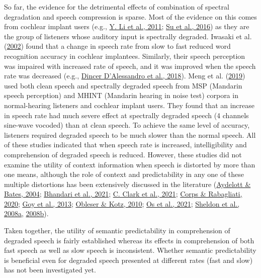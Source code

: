 \documentclass[a4paper, nobind]{templates/ociamthesis}
\begin{document}
So far, the evidence for the detrimental effects of combination of spectral degradation and speech compression is sparse. Most of the evidence on this comes from cochlear implant users (e.g., \protect\hyperlink{ref-Li2011}{Y. Li et al., 2011}; \protect\hyperlink{ref-Su2016}{Su et al., 2016}) as they are the group of listeners whose auditory input is spectrally degraded.
Iwasaki et al. (\protect\hyperlink{ref-Iwasaki2002}{2002}) found that a change in speech rate from slow to fast reduced word recognition accuracy in cochlear implantees.
Similarly, their speech perception was impaired with increased rate of speech, and it was improved when the speech rate was decreased (e.g., \protect\hyperlink{ref-Dincer2018}{Dincer D'Alessandro et al., 2018}).
Meng et al. (\protect\hyperlink{ref-Meng2019}{2019}) used both clean speech and spectrally degraded speech from MSP (Mandarin speech perception) and MHINT (Mandarin hearing in noise test) corpora in normal-hearing listeners and cochlear implant users.
They found that an increase in speech rate had much severe effect at spectrally degraded speech (4 channels sine-wave vocoded) than at clean speech.
To achieve the same level of accuracy, listeners required degraded speech to be much slower than the normal speech.
All of these studies indicated that when speech rate is increased, intelligibility and comprehension of degraded speech is reduced.
However, these studies did not examine the utility of context information when speech is distorted by more than one means, although the role of context and predictability in any one of these multiple distortions has been extensively discussed in the literature
(\protect\hyperlink{ref-Aydelott2004}{Aydelott \& Bates, 2004}; \protect\hyperlink{ref-Bhandari2021}{Bhandari et al., 2021}; \protect\hyperlink{ref-Clark2021}{C. Clark et al., 2021}; \protect\hyperlink{ref-Corps2020}{Corps \& Rabagliati, 2020}; \protect\hyperlink{ref-Goy2013}{Goy et al., 2013}; \protect\hyperlink{ref-Obleser2010}{Obleser \& Kotz, 2010}; \protect\hyperlink{ref-vanOs2021}{Os et al., 2021}; \protect\hyperlink{ref-Sheldon2008a}{Sheldon et al., 2008a}, \protect\hyperlink{ref-Sheldon2008b}{2008b}).

Taken together, the utility of semantic predictability in comprehension of degraded speech is fairly established whereas its effects in comprehension of both fast speech as well as slow speech is inconsistent.
Whether semantic predictability is beneficial even for degraded speech presented at different rates (fast and slow) has not been investigated yet.
\end{document}
